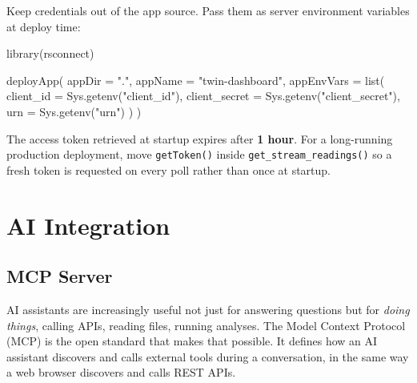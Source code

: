 \documentclass[
  11pt,
  letterpaper,
  DIV=11,
  numbers=noendperiod]{scrreprt}
\newenvironment{Shaded}{\begin{snugshade}}{\end{snugshade}}
\newcommand{\AttributeTok}[1]{\textcolor[rgb]{0.40,0.45,0.13}{#1}}
\newcommand{\FunctionTok}[1]{\textcolor[rgb]{0.28,0.35,0.67}{#1}}
\newcommand{\NormalTok}[1]{\textcolor[rgb]{0.00,0.23,0.31}{#1}}
\newcommand{\StringTok}[1]{\textcolor[rgb]{0.13,0.47,0.30}{#1}}
\begin{document}
Keep credentials out of the app source. Pass them as server environment
variables at deploy time:

\begin{Shaded}
\begin{Highlighting}[]
\FunctionTok{library}\NormalTok{(rsconnect)}

\FunctionTok{deployApp}\NormalTok{(}
  \AttributeTok{appDir     =} \StringTok{"."}\NormalTok{,}
  \AttributeTok{appName    =} \StringTok{"twin{-}dashboard"}\NormalTok{,}
  \AttributeTok{appEnvVars =} \FunctionTok{list}\NormalTok{(}
    \AttributeTok{client\_id     =} \FunctionTok{Sys.getenv}\NormalTok{(}\StringTok{"client\_id"}\NormalTok{),}
    \AttributeTok{client\_secret =} \FunctionTok{Sys.getenv}\NormalTok{(}\StringTok{"client\_secret"}\NormalTok{),}
    \AttributeTok{urn           =} \FunctionTok{Sys.getenv}\NormalTok{(}\StringTok{"urn"}\NormalTok{)}
\NormalTok{  )}
\NormalTok{)}
\end{Highlighting}
\end{Shaded}

\begin{tcolorbox}[enhanced jigsaw, titlerule=0mm, colback=white, colframe=quarto-callout-tip-color-frame, bottomtitle=1mm, bottomrule=.15mm, coltitle=black, arc=.35mm, left=2mm, title=\textcolor{quarto-callout-tip-color}{\faLightbulb}\hspace{0.5em}{Tip}, colbacktitle=quarto-callout-tip-color!10!white, toptitle=1mm, breakable, toprule=.15mm, rightrule=.15mm, leftrule=.75mm, opacitybacktitle=0.6, opacityback=0]

The access token retrieved at startup expires after \textbf{1 hour}. For
a long-running production deployment, move \texttt{getToken()} inside
\texttt{get\_stream\_readings()} so a fresh token is requested on every
poll rather than once at startup.

\end{tcolorbox}

\part{AI Integration}

\chapter{MCP Server}\label{mcp-server}

AI assistants are increasingly useful not just for answering questions
but for \emph{doing things}, calling APIs, reading files, running
analyses. The Model Context Protocol (MCP) is the open standard that
makes that possible. It defines how an AI assistant discovers and calls
external tools during a conversation, in the same way a web browser
discovers and calls REST APIs.
\end{document}

